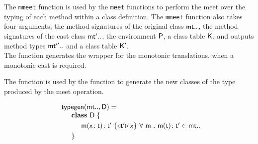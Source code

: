 \documentclass[sigconf]{acmart}
\begin{document}
The \texttt{mmeet} function is used by the \texttt{meet} functions to
perform the meet over the typing of each method within a class definition.
The \texttt{mmeet} function also takes four arguments, the method
signatures of the original class $\mt..$, the method signatures of the cast
class $\mtp..$, the environment $\P$, a class table $\K$, and outputs method
types $\mtpp..$ and a class table $\Kp$. \\


The  function generates the wrapper for the monotonic translations,
when a monotonic cast is required.


The  function is used by the  function to generate the new classes
of the type produced by the meet operation.

\footnotesize
\[\begin{array}{l@{~}r@{}r@{~}r@{~}r@{~}rr}
\arrayrulecolor{white}
\typegen{\mt..}{\D} = \\
\SP \class~\D~\{
\\[1mm]
\SPP \Mdef\m\x\t\tp {{\MonCast\tp{\x}}} 
&
\All m \Mtype\m\t\tp\in\mt..
\\[1mm]
\SP\}
\end{array}
\]
\normalsize



\end{document}
